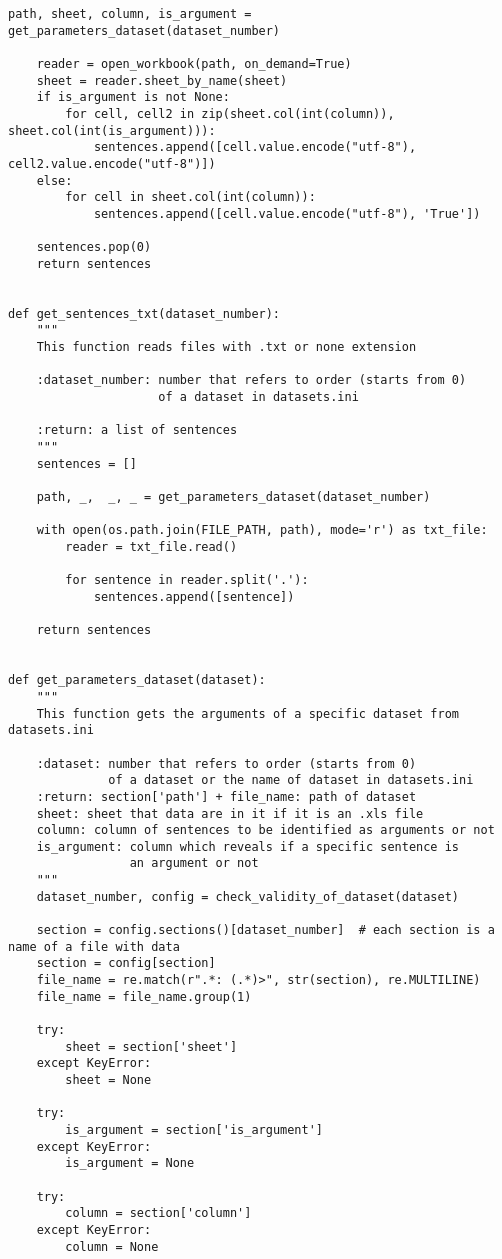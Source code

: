 \begin{lstlisting}[language=iPython]
	path, sheet, column, is_argument = get_parameters_dataset(dataset_number)
	
	reader = open_workbook(path, on_demand=True)
	sheet = reader.sheet_by_name(sheet)
	if is_argument is not None:
		for cell, cell2 in zip(sheet.col(int(column)), sheet.col(int(is_argument))):
			sentences.append([cell.value.encode("utf-8"), cell2.value.encode("utf-8")])
	else:
		for cell in sheet.col(int(column)):
			sentences.append([cell.value.encode("utf-8"), 'True'])
	
	sentences.pop(0)
	return sentences


def get_sentences_txt(dataset_number):
	"""
	This function reads files with .txt or none extension
	
	:dataset_number: number that refers to order (starts from 0) 
					 of a dataset in datasets.ini
	
	:return: a list of sentences
	"""
	sentences = []
	
	path, _,  _, _ = get_parameters_dataset(dataset_number)
	
	with open(os.path.join(FILE_PATH, path), mode='r') as txt_file:
		reader = txt_file.read()
		
		for sentence in reader.split('.'):
			sentences.append([sentence])
	
	return sentences


def get_parameters_dataset(dataset):
	"""
	This function gets the arguments of a specific dataset from datasets.ini
	
	:dataset: number that refers to order (starts from 0) 
			  of a dataset or the name of dataset in datasets.ini
	:return: section['path'] + file_name: path of dataset
	sheet: sheet that data are in it if it is an .xls file
	column: column of sentences to be identified as arguments or not
	is_argument: column which reveals if a specific sentence is 
				 an argument or not
	"""
	dataset_number, config = check_validity_of_dataset(dataset)
	
	section = config.sections()[dataset_number]  # each section is a name of a file with data
	section = config[section]
	file_name = re.match(r".*: (.*)>", str(section), re.MULTILINE)
	file_name = file_name.group(1)
	
	try:
		sheet = section['sheet']
	except KeyError:
		sheet = None
	
	try:
		is_argument = section['is_argument']
	except KeyError:
		is_argument = None
	
	try:
		column = section['column']
	except KeyError:
		column = None
	

\end{lstlisting}
